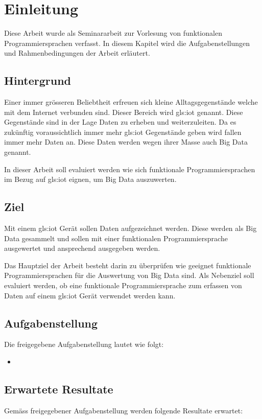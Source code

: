 
\chapter{Einleitung}
Diese Arbeit wurde als Seminararbeit zur Vorlesung von funktionalen Programmiersprachen verfasst.
In diesem Kapitel wird die Aufgabenstellungen und Rahmenbedingungen der Arbeit erläutert.

\section{Hintergrund}
Einer immer grösseren Beliebtheit erfreuen sich kleine Alltagsgegenstände welche mit dem Internet verbunden sind. Dieser Bereich wird \Gls{gls:iot} genannt. Diese Gegenstände sind in der Lage Daten zu erheben und weiterzuleiten. Da es zukünftig voraussichtlich immer mehr \Gls{gls:iot} Gegenstände geben wird fallen immer mehr Daten an. 
Diese Daten werden wegen ihrer Masse auch Big Data genannt.

In dieser Arbeit soll evaluiert werden wie sich funktionale Programmiersprachen im Bezug auf \Gls{gls:iot} eignen, um Big Data auszuwerten.


\section{Ziel}
Mit einem \Gls{gls:iot} Gerät sollen Daten aufgezeichnet werden. Diese werden als Big Data gesammelt und sollen mit einer funktionalen Programmiersprache ausgewertet und ansprechend ausgegeben werden.

Das Hauptziel der Arbeit besteht darin zu überprüfen wie geeignet funktionale Programmiersprachen für die Auswertung von Big Data sind. Als Nebenziel soll evaluiert werden, ob eine funktionale Programmiersprache zum erfassen von Daten auf einem \Gls{gls:iot} Gerät verwendet werden kann.

\section{Aufgabenstellung} \label{sec:Aufgabenstellung}
Die freigegebene Aufgabenstellung lautet wie folgt:

\begin{itemize}
\item 
\end{itemize}


\section{Erwartete Resultate} \label{sec:ErwarteteResultate}
Gemäss freigegebener Aufgabenstellung werden folgende Resultate erwartet:

